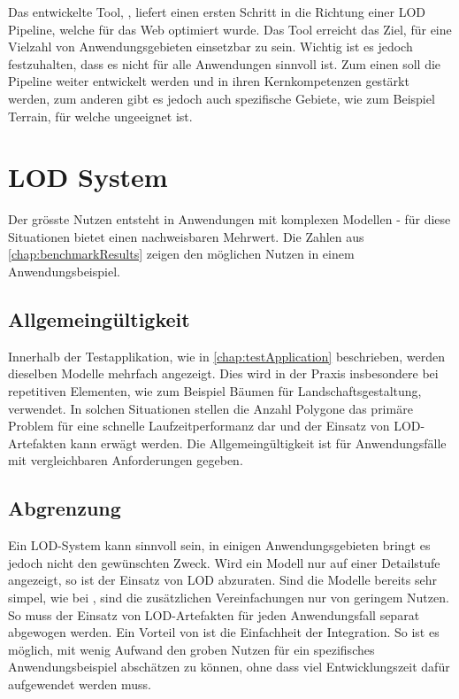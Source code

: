 Das entwickelte Tool, , liefert einen ersten Schritt in die Richtung einer LOD Pipeline, welche für das Web optimiert wurde. Das Tool erreicht das Ziel, für eine Vielzahl von Anwendungsgebieten einsetzbar zu sein. Wichtig ist es jedoch festzuhalten, dass es nicht für alle Anwendungen sinnvoll ist. Zum einen soll die Pipeline weiter entwickelt werden und in ihren Kernkompetenzen gestärkt werden, zum anderen gibt es jedoch auch spezifische Gebiete, wie zum Beispiel Terrain, für welche  ungeeignet ist.

\section{LOD System}

Der grösste Nutzen entsteht in Anwendungen mit komplexen Modellen - für diese Situationen bietet  einen nachweisbaren Mehrwert. Die Zahlen aus \autoref{chap:benchmarkResults} zeigen den möglichen Nutzen in einem Anwendungsbeispiel.

\subsection{Allgemeingültigkeit}

Innerhalb der Testapplikation, wie in \autoref{chap:testApplication} beschrieben, werden dieselben Modelle mehrfach angezeigt. Dies wird in der Praxis insbesondere bei repetitiven Elementen, wie zum Beispiel Bäumen für Landschaftsgestaltung, verwendet. In solchen Situationen stellen die Anzahl Polygone das primäre Problem für eine schnelle Laufzeitperformanz dar und der Einsatz von LOD-Artefakten kann erwägt werden. Die Allgemeingültigkeit ist für Anwendungsfälle mit vergleichbaren Anforderungen gegeben.

\subsection{Abgrenzung}

Ein LOD-System kann sinnvoll sein, in einigen Anwendungsgebieten bringt es jedoch nicht den gewünschten Zweck. Wird ein Modell nur auf einer Detailstufe angezeigt, so ist der Einsatz von LOD abzuraten. Sind die Modelle bereits sehr simpel, wie bei , sind die zusätzlichen Vereinfachungen nur von geringem Nutzen.
So muss der Einsatz von LOD-Artefakten für jeden Anwendungsfall separat abgewogen werden. Ein Vorteil von  ist die Einfachheit der Integration. So ist es möglich, mit wenig Aufwand den groben Nutzen für ein spezifisches Anwendungsbeispiel abschätzen zu können, ohne dass viel Entwicklungszeit dafür aufgewendet werden muss.

